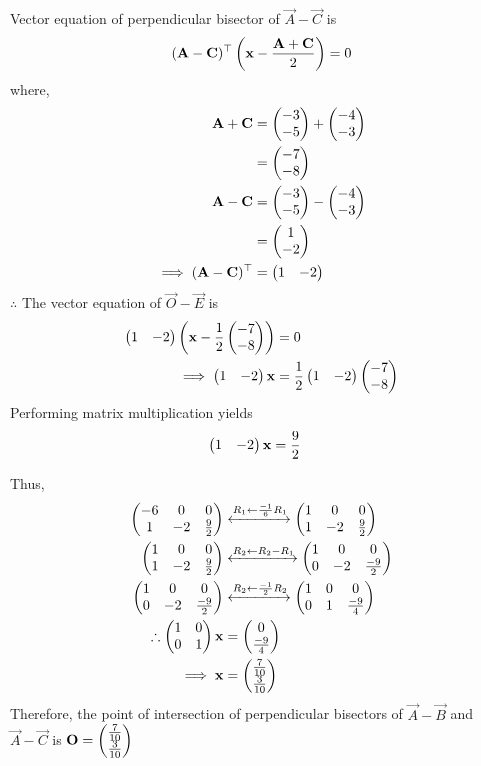 \documentclass[11pt]{book}
\begin{document}
\begin{enumerate}[label=\thesection.\arabic*.,ref=\thesection.\theenumi]
Vector equation of perpendicular bisector of $\vec{A}-\vec{C}$ is
\begin{align}
(\mathbf{A}-\mathbf{C})^\top\left( \mathbf{x} - \frac{\mathbf{A}+\mathbf{C}}{2}\right) = 0
\end{align}
where,
\begin{align}
\mathbf{A}+\mathbf{C}&=\begin{pmatrix}-3\\-5\end{pmatrix}+\begin{pmatrix}-4\\-3\end{pmatrix}\\
&=\begin{pmatrix}-7\\-8\end{pmatrix}\\
\mathbf{A}-\mathbf{C} &= \begin{pmatrix}-3\\-5\end{pmatrix}-\begin{pmatrix}-4\\-3\end{pmatrix}\\
&=\begin{pmatrix}1\\-2\end{pmatrix}\\
\implies (\mathbf{A}-\mathbf{C})^\top &= \begin{pmatrix}1&-2\end{pmatrix}
\end{align}
$\therefore $ The vector equation of $\vec{O}-\vec{E}$ is
\begin{align}
\begin{pmatrix}1&-2\end{pmatrix}\left( \mathbf{x}-\frac{1}{2}\begin{pmatrix}-7\\-8\end{pmatrix}\right)&=0\\
\implies \begin{pmatrix}1&-2\end{pmatrix}\mathbf{x}&=\frac{1}{2}\begin{pmatrix}1&-2\end{pmatrix}\begin{pmatrix}-7\\-8\end{pmatrix}
\end{align}
Performing matrix multiplication yields
\begin{align}
\begin{pmatrix}1&-2\end{pmatrix}\mathbf{x}&=\frac{9}{2}
\end{align}

Thus,
\begin{align}
\begin{pmatrix}-6&0&0\\1&-2&\frac{9}{2}\end{pmatrix} &\xleftrightarrow[]{R_1 \leftarrow \frac{-1}{6} R_1} \begin{pmatrix}1&0&0\\1&-2&\frac{9}{2}\end{pmatrix}\\
\begin{pmatrix}1&0&0\\1&-2&\frac{9}{2}\end{pmatrix} &\xleftrightarrow[]{R_2\leftarrow R_2 - R_1}
\begin{pmatrix}1&0& 0\\0&-2&\frac{-9}{2}\end{pmatrix}\\
\begin{pmatrix}1&0& 0\\0&-2&\frac{-9}{2}\end{pmatrix} &\xleftrightarrow[]{R_2 \leftarrow \frac{-1}{2}R_2} \begin{pmatrix}1&0&0 \\0&1&\frac{-9}{4}\end{pmatrix}\\
\therefore \begin{pmatrix}1&0\\0&1\end{pmatrix}\mathbf{x} &= \begin{pmatrix}0\\\frac{-9}{4}\end{pmatrix}\\
\implies \mathbf{x}&=\begin{pmatrix}\frac{7}{10}\\\frac{3}{10}\end{pmatrix}
\end{align}
Therefore, the point of intersection of perpendicular bisectors of $\vec{A}-\vec{B}$ and $\vec{A}-\vec{C}$ is $\mathbf{O} = \begin{pmatrix}\frac{7}{10}\\ \frac{3}{10}\end{pmatrix}$


\end{enumerate}
\end{document}
